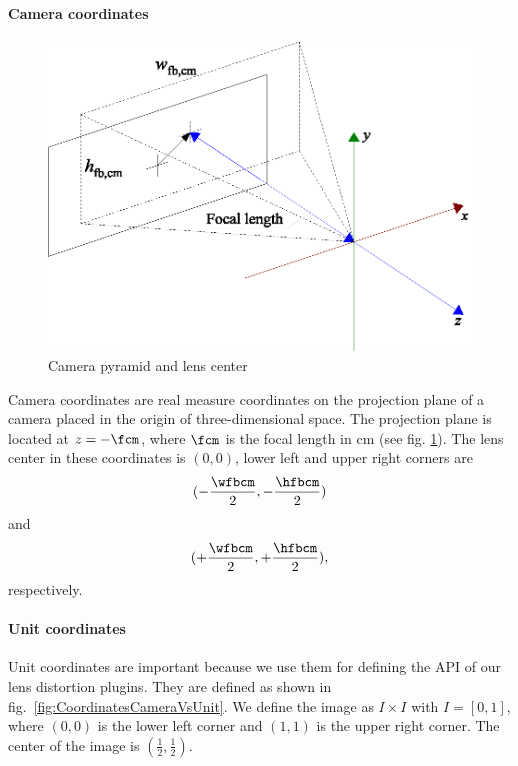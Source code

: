 \documentclass[10pt,a4paper]{article}
\begin{document}
\paragraph{Camera coordinates}
\begin{figure}
\centering
\includegraphics{camera_pyramid_and_lens_center}
\caption{Camera pyramid and lens center}
\label{fig:CameraPyramidAndLensCenter}
\end{figure}
Camera coordinates are real measure coordinates
on the projection plane of a camera placed in
the origin of three-dimensional space.
The projection plane is located at $z=-\fcm$, where $\fcm$
is the focal length in cm (see fig.
\ref{fig:CameraPyramidAndLensCenter}).
The lens center in these coordinates is $(0,0)$, lower left
and upper right corners are
\begin{equation}
(-\frac \wfbcm 2,-\frac \hfbcm 2)
\end{equation}
and
\begin{equation}
(+\frac \wfbcm 2,+\frac \hfbcm 2),
\end{equation}
respectively.

%
\paragraph{Unit coordinates}
\label{UnitCoordinates}
Unit coordinates are important because we use them for
defining the API of our lens distortion plugins.
They are defined as shown in fig.~\ref{fig:CoordinatesCameraVsUnit}.
We define the image as $I\times I$ with $I=[0,1]$, where $(0,0)$ is the lower left corner
and $(1,1)$ is the upper right corner. The center of the image is $(\frac 1 2,\frac 1 2)$.
\end{document}
